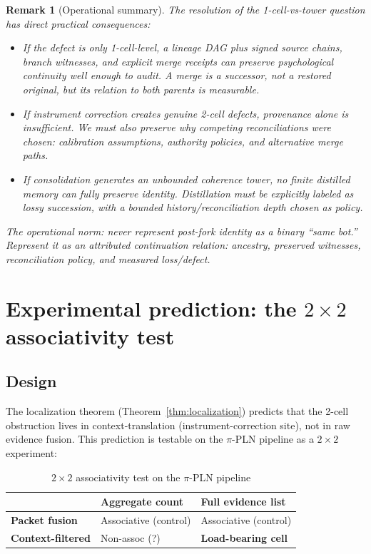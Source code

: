 \documentclass[11pt]{article}
\newtheorem{remark}{Remark}
\begin{document}
\begin{remark}[Operational summary]
The resolution of the 1-cell-vs-tower question has direct practical consequences:
\begin{itemize}
  \item If the defect is only 1-cell-level, a lineage DAG plus signed source chains, branch
        witnesses, and explicit merge receipts can preserve psychological continuity well
        enough to audit. A merge is a successor, not a restored original, but its relation to
        both parents is measurable.
  \item If instrument correction creates genuine 2-cell defects, provenance alone is
        insufficient. We must also preserve \emph{why} competing reconciliations were chosen:
        calibration assumptions, authority policies, and alternative merge paths.
  \item If consolidation generates an unbounded coherence tower, no finite distilled memory
        can fully preserve identity. Distillation must be explicitly labeled as lossy
        succession, with a bounded history/reconciliation depth chosen as policy.
\end{itemize}
The operational norm: never represent post-fork identity as a binary ``same bot.'' Represent
it as an attributed continuation relation: ancestry, preserved witnesses, reconciliation
policy, and measured loss/defect.
\end{remark}

\section{Experimental prediction: the $2 \times 2$ associativity test}

\subsection{Design}

The localization theorem (Theorem~\ref{thm:localization}) predicts that the 2-cell obstruction
lives in context-translation (instrument-correction site), not in raw evidence fusion. This
prediction is testable on the $\pi$-PLN pipeline as a $2 \times 2$ experiment:

\begin{table}[h]
\centering
\begin{tabular}{|l|l|l|}
\hline
 & \textbf{Aggregate count} & \textbf{Full evidence list} \\
\hline
\textbf{Packet fusion} & Associative (control) & Associative (control) \\
\textbf{Context-filtered} & Non-assoc (?) & \textbf{Load-bearing cell} \\
\hline
\end{tabular}
\caption{$2 \times 2$ associativity test on the $\pi$-PLN pipeline}
\label{tab:2x2-test}
\end{table}
\end{document}

